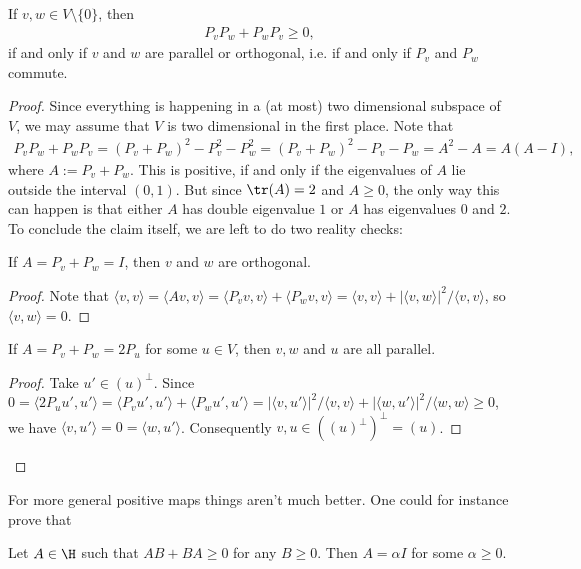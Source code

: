 \begin{prop}\label{symmetric_projection}
	If $v, w \in V \setminus \{0\}$, then
	\begin{align*}
		P_{v} P_{w} + P_{w} P_{v} \geq 0,
	\end{align*}
	if and only if $v$ and $w$ are parallel or orthogonal, i.e. if and only if $P_{v}$ and $P_{w}$ commute.
\end{prop}
\begin{proof}
	Since everything is happening in a (at most) two dimensional subspace of $V$, we may assume that $V$ is two dimensional in the first place. Note that
	\begin{align*}
		P_{v} P_{w} + P_{w} P_{v} = (P_{v} + P_{w})^2 - P_{v}^2 - P_{w}^2 = (P_{v} + P_{w})^2 - P_{v} - P_{w} = A^2 - A = A (A - I),
	\end{align*}
	where $A := P_{v} + P_{w}$. This is positive, if and only if the eigenvalues of $A$ lie outside the interval $(0, 1)$. But since $\tr(A) = 2$ and $A \geq 0$, the only way this can happen is that either $A$ has double eigenvalue $1$ or $A$ has eigenvalues $0$ and $2$. To conclude the claim itself, we are left to do two reality checks:
	\begin{lem}
		If $A = P_{v} + P_{w} = I$, then $v$ and $w$ are orthogonal.
	\end{lem}
	\begin{proof}
		Note that $\langle v, v \rangle = \langle A v, v \rangle = \langle P_{v} v, v \rangle + \langle P_{w} v, v \rangle = \langle v, v \rangle + |\langle v, w \rangle|^2/\langle v, v\rangle$, so $\langle v, w \rangle = 0$.
	\end{proof}
	\begin{lem}
		If $A = P_{v} + P_{w} = 2 P_{u}$ for some $u \in V$, then $v, w$ and $u$ are all parallel.
	\end{lem}
	\begin{proof}
		Take $u' \in (u)^{\perp}$. Since $0 = \langle 2 P_{u} u', u' \rangle =  \langle P_{v} u', u' \rangle +  \langle P_{w} u', u' \rangle = |\langle v, u' \rangle|^2/\langle v, v\rangle + |\langle w, u' \rangle|^2/\langle w, w\rangle \geq 0$, we have $\langle v, u' \rangle = 0 = \langle w, u' \rangle$. Consequently $v, u \in ((u)^{\perp})^{\perp} = (u)$.
	\end{proof}
\end{proof}

For more general positive maps things aren't much better. One could for instance prove that

\begin{prop}
	Let $A \in \H$ such that $A B + B A \geq 0$ for any $B \geq 0$. Then $A = \alpha I$ for some $\alpha \geq 0$.
\end{prop}

